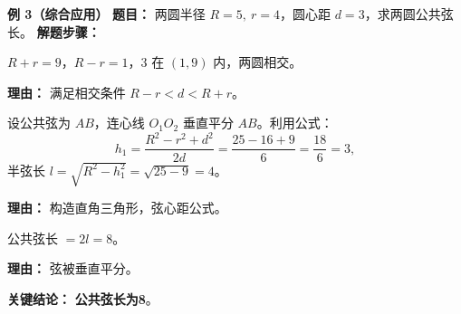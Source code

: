 \begin{examplebox}
	\medskip
	\textbf{\textcolor{CExample}{例 3（综合应用）}}
	\textbf{\textcolor{CExample}{题目：}}
	两圆半径 $R=5,\ r=4$，圆心距 $d=3$，求两圆公共弦长。
	\textbf{\textcolor{CExample}{解题步骤：}}
	\begin{description}[style=nextline, leftmargin=2.8em, labelsep=0.5em, itemsep=0.45em]
		\item[\textbf{第一步（验证相交）：}]
			$R+r=9$，$R-r=1$，$3$ 在 $(1,9)$ 内，两圆相交。
			\par\textbf{理由：} 满足相交条件 $R-r<d<R+r$。
		\item[\textbf{第二步（求弦心距）：}]
			设公共弦为 $AB$，连心线 $O_1O_2$ 垂直平分 $AB$。利用公式：
			\[
				h_1 = \frac{R^2 - r^2 + d^2}{2d} = \frac{25 - 16 + 9}{6} = \frac{18}{6}=3,
			\]
			半弦长 $l = \sqrt{R^2 - h_1^2} = \sqrt{25 - 9} = 4$。
			\par\textbf{理由：} 构造直角三角形，弦心距公式。
		\item[\textbf{第三步（得弦长）：}]
			公共弦长 $= 2l = 8$。
			\par\textbf{理由：} 弦被垂直平分。
	\end{description}
	\textbf{\textcolor{CExample}{关键结论：}}
	\textbf{公共弦长为8}。
\end{examplebox}
